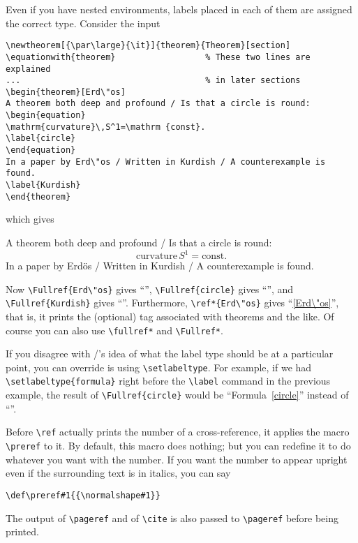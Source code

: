 Even if you have nested
environments, labels placed in each of them are assigned the correct
type. Consider the input 
%
\begin{verbatim}
\newtheorem[{\par\large}{\it}]{theorem}{Theorem}[section]
\equationwith{theorem}                  % These two lines are explained
...                                     % in later sections
\begin{theorem}[Erd\"os]
A theorem both deep and profound / Is that a circle is round:
\begin{equation}
\mathrm{curvature}\,S^1=\mathrm {const}.
\label{circle}
\end{equation}
In a paper by Erd\"os / Written in Kurdish / A counterexample is found.
\label{Kurdish}
\end{theorem}
\end{verbatim}
%
which gives
%
\begin{theorem}[Erd\"os]
A theorem both deep and profound / Is that a circle is round:
\begin{equation}
\mathrm{curvature}\,S^1=\mathrm {const}.
\label{circle}
\end{equation}
In a paper by Erd\"os / Written in Kurdish / A counterexample is found.
\label{Kurdish}
\end{theorem}
Now \verb+\Fullref{Erd\"os}+ gives ``'',
\verb+\Fullref{circle}+ gives ``'', and
\verb+\Fullref{Kurdish}+ gives ``''.  Furthermore,
\verb+\ref*{Erd\"os}+ gives ``\ref*{Erd\"os}'', that is, it prints the
(optional) tag associated with theorems and the like.  Of course you
can also use \verb+\fullref*+ and \verb+\Fullref*+.

\begin{wizard}
If you disagree with \latex/'s idea of what the label type should be
at a particular point, you can override is using \verb+\setlabeltype+.
For example, if we had \verb+\setlabeltype{formula}+ right before the
\verb+\label+ command in the previous example, the result of
\verb+\Fullref{circle}+ would be ``Formula~\ref{circle}'' instead of
``''.
\end{wizard}

Before \verb+\ref+ actually prints the number of a cross-reference, it
applies the macro \verb+\preref+ to it.  By default, this macro does
nothing; but you can redefine it to do whatever you want with the
number.  If you want the number to appear upright even if the
surrounding text is in italics, you can say
\begin{verbatim}
\def\preref#1{{\normalshape#1}}
\end{verbatim}
The output of \verb+\pageref+ and of \verb+\cite+ is also passed to
\verb+\pageref+ before being printed.

